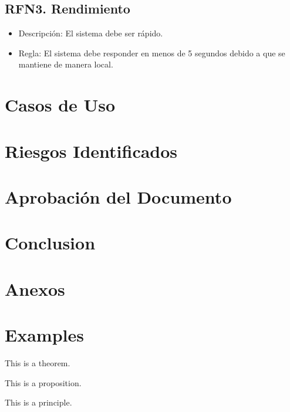 \documentclass{article}
\begin{document}
\subsection{RFN3. Rendimiento}
\begin{itemize}
    \item Descripción: El sistema debe ser rápido.
    \item Regla: El sistema debe responder en menos de 5 segundos debido a que se mantiene de manera local.
\end{itemize}

\section{Casos de Uso}

\section{Riesgos Identificados}

\section{Aprobación del Documento}

\section{Conclusion}

\section{Anexos}

\newpage
\section{Examples}

\begin{theorem}
	This is a theorem.
\end{theorem}

\begin{proposition}
	This is a proposition.
\end{proposition}

\begin{principle}
	This is a principle.
\end{principle}

\end{document}
